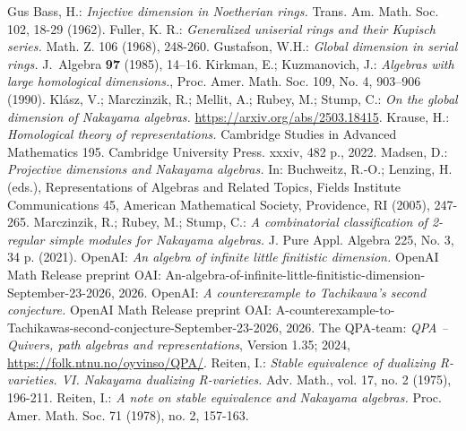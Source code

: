 \documentclass[a4paper]{amsart}
\theoremstyle{definition}
\theoremstyle{remark}
\numberwithin{equation}{theorem}
\begin{document}
\begin{thebibliography}{Gus}
 Bass, H.: {\it Injective dimension in Noetherian rings.}  Trans. Am. Math. Soc. 102, 18-29 (1962).
 Fuller, K. R.: \textit{Generalized uniserial rings and their Kupisch series.} Math. Z. 106 (1968), 248-260.
 Gustafson, W.H.:
{\it Global dimension in serial rings.}
J.\ Algebra \textbf{97} (1985), 14--16.
 Kirkman, E.; Kuzmanovich, J.:
{\it Algebras with large homological dimensions.},
Proc. Amer. Math. Soc. 109, No. 4, 903--906 (1990).
 Kl\'asz, V.; Marczinzik, R.; Mellit, A.; Rubey, M.; Stump, C.: {\it On the global dimension of Nakayama algebras.} \url{https://arxiv.org/abs/2503.18415}.
 Krause, H.: {\it Homological theory of representations.} Cambridge Studies in Advanced Mathematics 195.  Cambridge University Press. xxxiv, 482 p., 2022.
 Madsen, D.: {\it Projective dimensions and Nakayama algebras.} In: Buchweitz, R.-O.; Lenzing, H. (eds.), Representations of Algebras and Related Topics, Fields Institute Communications 45, American Mathematical Society, Providence, RI (2005), 247-265.
 Marczinzik, R.; Rubey, M.; Stump, C.: {\it A combinatorial classification of 2-regular simple modules for Nakayama algebras.} J. Pure Appl. Algebra 225, No. 3, 34 p. (2021).
 OpenAI:
{\it An algebra of infinite little finitistic dimension.}
OpenAI Math Release preprint OAI: An-algebra-of-infinite-little-finitistic-dimension-September-23-2026, 2026.
 OpenAI:
{\it A counterexample to Tachikawa's second conjecture.}
OpenAI Math Release preprint OAI: A-counterexample-to-Tachikawas-second-conjecture-September-23-2026,
2026.
 The QPA-team: {\it QPA -- Quivers, path algebras and representations}, Version 1.35; 2024, \url{https://folk.ntnu.no/oyvinso/QPA/}.
 Reiten, I.: {\it Stable equivalence of dualizing R-varieties. VI. Nakayama dualizing R-varieties.} Adv. Math., vol. 17, no. 2 (1975), 196-211.
 Reiten, I.: {\it A note on stable equivalence and Nakayama algebras.} Proc. Amer. Math. Soc. 71 (1978), no. 2, 157-163.

\end{thebibliography}
\end{document}
